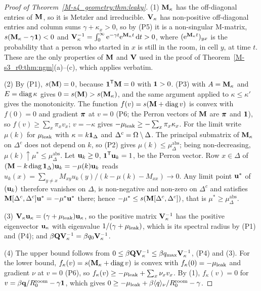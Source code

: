 \begin{proof}[Proof of Theorem~\ref{M-s4_geometry:thm:leaky}]
  (1) $\mathbf{M}_{\kappa}$ has the off-diagonal entries of $\mathbf{M}$, so it is Metzler and irreducible. $\mathbf{V}_\kappa$ has
  non-positive off-diagonal entries and column sums $\gamma+\kappa_x>0$, so by (P5) it is a non-singular
  M-matrix, $s(\mathbf{M}_{\kappa}-\gamma\mathbf{1})<0$ and
  $\mathbf{V}_\kappa^{-1}=\int_0^\infty\mathrm{e}^{-\gamma t}\mathrm{e}^{\mathbf{M}_{\kappa} t}\,\mathrm{d} t>0$, where $(\mathrm{e}^{\mathbf{M}_{\kappa} t})_{yx}$ is the
  probability that a person who started in $x$ is still in the room, in cell $y$, at time $t$. These are the
  only properties of $\mathbf{M}$ and $\mathbf{V}$ used in the proof of Theorem~\ref{M-s3_r0:thm:ngm}(a)--(c), which applies
  verbatim.

  (2) By (P1), $s(\mathbf{M})=0$, because $\boldsymbol{1}^{\mathsf{T}}\mathbf{M}=0$ with $\boldsymbol{1}>0$. (P3) with $A=\mathbf{M}_{\kappa}$ and
  $E=\operatorname{diag}\kappa$ gives $0=s(\mathbf{M})>s(\mathbf{M}_{\kappa})$, and the same argument applied to $\kappa\le\kappa'$ gives
  the monotonicity. The function $f(v)=s(\mathbf{M}+\operatorname{diag} v)$ is convex with $f(0)=0$ and gradient $\boldsymbol{\pi}$ at
  $v=0$ (P6; the Perron vectors of $\mathbf{M}$ are $\boldsymbol{\pi}$ and $\boldsymbol{1}$), so $f(v)\ge\sum_x\pi_xv_x$; $v=-\kappa$ gives
  $-\mu_{\mathrm{leak}}\ge-\sum_x\pi_x\kappa_x$. For the limit write $\mu(k)$ for $\mu_{\mathrm{leak}}$ with $\kappa=k\boldsymbol{1}_\Delta$ and
  $\Delta^c=\Omega\setminus\Delta$. The principal submatrix of $\mathbf{M}_{\kappa}$ on $\Delta^c$ does not depend on $k$, so
  (P2) gives $\mu(k)\le\mu^{\mathrm{abs}}_\Delta$; being non-decreasing, $\mu(k)\uparrow\mu^*\le\mu^{\mathrm{abs}}_\Delta$.
  Let $\mathbf{u}_k\ge0$, $\boldsymbol{1}^{\mathsf{T}}\mathbf{u}_k=1$, be the Perron vector. Row $x\in\Delta$ of
  $(\mathbf{M}-k\operatorname{diag}\boldsymbol{1}_\Delta)\mathbf{u}_k=-\mu(k)\mathbf{u}_k$ reads
  $u_k(x)=\sum_{y\ne x}M_{xy}u_k(y)/(k-\mu(k)-M_{xx})\to0$. Any limit point $\mathbf{u}^*$ of $(\mathbf{u}_k)$ therefore
  vanishes on $\Delta$, is non-negative and non-zero on $\Delta^c$ and satisfies
  $\mathbf{M}[\Delta^c,\Delta^c]\mathbf{u}^*=-\mu^*\mathbf{u}^*$ there; hence $-\mu^*\le s(\mathbf{M}[\Delta^c,\Delta^c])$, that is
  $\mu^*\ge\mu^{\mathrm{abs}}_\Delta$.

  (3) $\mathbf{V}_\kappa\mathbf{u}_\kappa=(\gamma+\mu_{\mathrm{leak}})\mathbf{u}_\kappa$, so the positive matrix $\mathbf{V}_\kappa^{-1}$ has the
  positive eigenvector $\mathbf{u}_\kappa$ with eigenvalue $1/(\gamma+\mu_{\mathrm{leak}})$, which is its spectral radius by (P1)
  and (P4); and $\beta\mathbf{Q}\mathbf{V}_\kappa^{-1}=\beta q_0\mathbf{V}_\kappa^{-1}$.

  (4) The upper bound follows from $0\le\beta\mathbf{Q}\mathbf{V}_\kappa^{-1}\le\beta q_{\max}\mathbf{V}_\kappa^{-1}$, (P4) and (3). For
  the lower bound, $f_\kappa(v)=s(\mathbf{M}_{\kappa}+\operatorname{diag} v)$ is convex with $f_\kappa(0)=-\mu_{\mathrm{leak}}$ and gradient $\nu$ at
  $v=0$ (P6), so $f_\kappa(v)\ge-\mu_{\mathrm{leak}}+\sum_x\nu_xv_x$. By (1), $f_\kappa(v)=0$ for
  $v=\beta\mathbf{q}/R_0^{\mathrm{room}}-\gamma\boldsymbol{1}$, which gives $0\ge-\mu_{\mathrm{leak}}+\beta\langle q\rangle_\nu/R_0^{\mathrm{room}}-\gamma$.
\end{proof}

